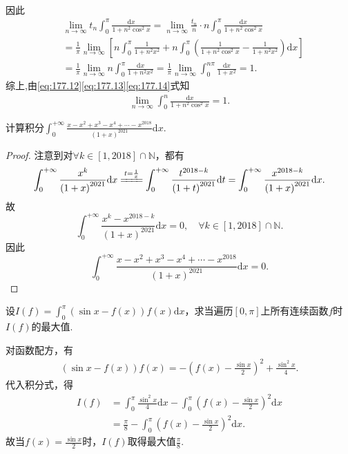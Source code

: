 \documentclass[../../main.tex]{subfiles}%
\begin{document}
\begin{solution}
\begin{align*}
\end{align*}
因此
\begin{align}
&\lim\limits_{n\rightarrow \infty}t_n\int_0^{\pi}{\frac{\mathrm{d}x}{1+n^2\cos ^2x}}=\lim\limits_{n\rightarrow \infty}\frac{t_n}{n}\cdot n\int_0^{\pi}{\frac{\mathrm{d}x}{1+n^2\cos ^2x}} \nonumber \\
&=\frac{1}{\pi}\lim\limits_{n\rightarrow \infty}\left[ n\int_0^{\pi}{\frac{1}{1+n^2x^2}}+n\int_0^{\pi}{\left( \frac{1}{1+n^2\cos ^2x}-\frac{1}{1+n^2x^2} \right) \mathrm{d}x} \right] \nonumber \\
&=\frac{1}{\pi}\lim\limits_{n\rightarrow \infty}n\int_0^{\pi}{\frac{\mathrm{d}x}{1+n^2x^2}}=\frac{1}{\pi}\lim\limits_{n\rightarrow \infty}\int_0^{n\pi}{\frac{\mathrm{d}x}{1+x^2}}=1. \label{eq:177.14}
\end{align}
综上,由\eqref{eq:177.12}\eqref{eq:177.13}\eqref{eq:177.14}式知
\begin{align*}
\lim_{n\rightarrow \infty} \int_0^n{\frac{\mathrm{d}x}{1+n^2\cos ^2x}}=1.
\end{align*}

\end{solution}

\begin{example}
计算积分$\int_{0}^{+\infty} \frac{x - x^2 + x^3 - x^4 + \cdots - x^{2018}}{(1 + x)^{2021}} \mathrm{d}x$.
\end{example}
\begin{proof}

注意到对$\forall k\in \left[ 1,2018 \right] \cap \mathbb{N}$，都有
$$\int_0^{+\infty}{\frac{x^k}{\left( 1+x \right) ^{2021}}\mathrm{d}x}\xlongequal{t=\frac{1}{x}}\int_0^{+\infty}{\frac{t^{2018-k}}{\left( 1+t \right) ^{2021}}\mathrm{d}t}=\int_0^{+\infty}{\frac{x^{2018-k}}{\left( 1+x \right) ^{2021}}\mathrm{d}x}.$$
故
$$\int_0^{+\infty}{\frac{x^k-x^{2018-k}}{\left( 1+x \right) ^{2021}}\mathrm{d}x}=0,\quad \forall k\in \left[ 1,2018 \right] \cap \mathbb{N} .$$
因此
$$\int_0^{+\infty}{\frac{x-x^2+x^3-x^4+\cdots -x^{2018}}{\left( 1+x \right) ^{2021}}\mathrm{d}x}=0.$$

\end{proof}

\begin{example}
设$I(f) = \int_{0}^{\pi} (\sin x - f(x))f(x) \mathrm{d}x$，求当遍历$[0, \pi]$上所有连续函数$f$时$I(f)$的最大值.
\end{example}
\begin{solution}

对函数配方，有
\begin{align*}
(\sin x - f(x))f(x) = -\left(f(x) - \frac{\sin x}{2}\right)^2 + \frac{\sin^2 x}{4}.
\end{align*}
代入积分式，得
\begin{align*}
I(f) &= \int_{0}^{\pi} \frac{\sin^2 x}{4} \mathrm{d}x - \int_{0}^{\pi} \left(f(x) - \frac{\sin x}{2}\right)^2 \mathrm{d}x \\
&= \frac{\pi}{8} - \int_{0}^{\pi} \left(f(x) - \frac{\sin x}{2}\right)^2 \mathrm{d}x.
\end{align*}
故当\(f(x) = \frac{\sin x}{2}\)时，\(I(f)\)取得最大值\(\frac{\pi}{8}\).

\end{solution}
\end{document}

